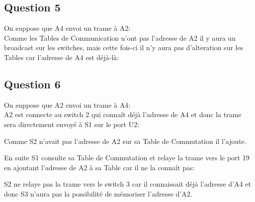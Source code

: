 \documentclass{article}
\begin{document}
\subsection*{Question 5}
\begin{resolution}
    On suppose que A4 envoi un trame à A2:\\

    Comme les Tables de Communication n'ont pas l'adresse de A2 il y aura un broadcast sur les switches, mais cette fois-ci il n'y aura pas d'alteration sur les Tables car l'adresse de A4 est déjà-là:
\end{resolution}

\subsection*{Question 6}
\begin{resolution}
    On suppose que A2 envoi un trame à A4:\\

    A2 est connecte au switch 2 qui connaît déjà l'adresse de A4 et donc la trame sera directement envoyé à S1 sur le port U2:
    \begin{remark}
        Comme S2 n'avait pas l'adresse de A2 sur sa Table de Commutation il l'ajoute.
    \end{remark}
    En suite S1 consulte sa Table de Commutation et relaye la trame vers le port 19 en ajoutant l'adresse de A2 à sa Table car il ne la connaît pas:
    \begin{remark}
        S2 ne relaye pas la trame vers le switch 3 car il connaissait déjà l'adresse d'A4 et donc S3 n'aura pas la possibilité de mémoriser l'adresse d'A2. 
    \end{remark}
\end{resolution}
\end{document}
